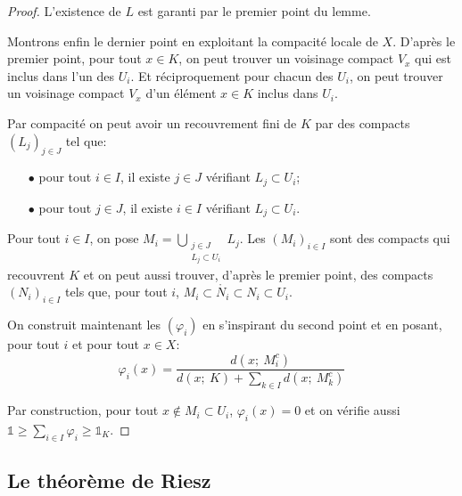 \begin{proof}
L'existence de $L$ est garanti par le premier point du lemme.

\medskip
Montrons enfin le dernier point en exploitant la compacité locale de $X$. D'après le premier point, pour tout $x \in K$, on peut trouver un voisinage compact $V_x$ qui est inclus dans l'un des $U_i$. Et réciproquement pour chacun des $U_i$, on peut trouver un voisinage compact $V_x$ d'un élément $x \in K$ inclus dans $U_i$.

\medskip
Par compacité on peut avoir un recouvrement fini de $K$ par des compacts $(L_j)_{j \in J}$ tel que:
\begin{itemize}
\item[$\bullet$] 
 pour tout $i \in I$, il existe $j \in J$ vérifiant $L_j \subset U_i$;
\item[$\bullet$] 
 pour tout $j \in J$, il existe $i \in I$ vérifiant $L_j \subset U_i$.
 \end{itemize} 

Pour tout $i \in I$, on pose $M_i = \bigcup \limits_{\substack{j \in J\\L_j \subset U_i}} L_j$. Les $(M_i)_{i \in I}$ sont des compacts qui recouvrent $K$ et on peut aussi trouver, d'après le premier point, des compacts $(N_i)_{i \in I}$ tels que, pour tout $i$, $M_i \subset \mathring{N_i} \subset N_i  \subset U_i$. 

\medskip
On construit maintenant les $(\varphi_i)$ en s'inspirant du second point et en posant, pour tout $i$ et pour tout $x \in X$:
\[
\varphi_i(x)  = \dfrac{d(x;~M_i^c)}{d(x;~K) + \sum \limits_{k \in I} d(x;~M_k^c)}
\]

Par construction, pour tout $x \notin M_i \subset U_i$, $\varphi_i(x) = 0$ et on vérifie aussi $\mathbb{1} \geq \displaystyle{\sum \limits_{i \in I}} \varphi_i \geq \mathbb{1}_K$.
\end{proof}


\subsection{Le théorème de Riesz}

